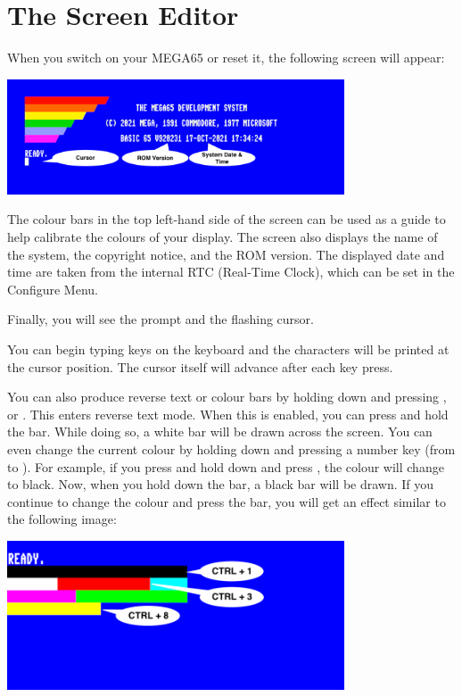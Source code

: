 \section{The Screen Editor}
\label{sec:screen-editor}

When you switch on your MEGA65 or reset it, the following screen will appear:

\begin{center}
\includegraphics[width={10cm}]{images/introduction-screen/layout.png}
\end{center}

The colour bars in the top left-hand side of the screen can be used
as a guide to help calibrate the colours of your display.
The screen also displays the name of the system,
the copyright notice, and the ROM version.
The displayed date and time are taken from the internal RTC
(Real-Time Clock), which can be set in the Configure Menu.

Finally, you will see the  prompt and the flashing cursor.

You can begin typing keys on the keyboard and the characters will be
printed at the cursor position. The cursor itself will advance after
each key press.

You can also produce reverse text or colour bars by holding down  and pressing , or . This enters reverse text mode. When this is enabled, you can press and hold the  bar. While doing so, a white bar will be drawn across the screen.
You can even change the current colour by holding  down and pressing a number key (from 
to ). For example, if you press and hold  down and press , the colour will
change to black. Now, when you hold down the  bar, a black bar will be drawn. If you continue to
change the colour and press the  bar, you will get an effect similar to the following image:


\begin{center}
\includegraphics[width={10cm}]{images/introduction-screen/colour-bars.png}
\end{center}


